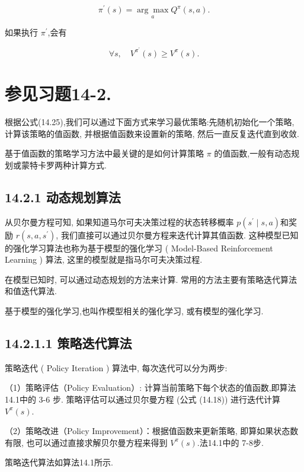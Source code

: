 \documentclass[10pt]{article}
\begin{document}
\begin{equation*}
\pi^{\prime}(s)=\underset{a}{\arg \max } Q^{\pi}(s, a) . \tag{14.24}
\end{equation*}


如果执行 $\pi^{\prime}$,会有


\begin{equation*}
\forall s, \quad V^{\pi^{\prime}}(s) \geq V^{\pi}(s) . \tag{14.25}
\end{equation*}


\section*{参见习题14-2.}
根据公式(14.25),我们可以通过下面方式来学习最优策略:先随机初始化一个策略, 计算该策略的值函数, 并根据值函数来设置新的策略, 然后一直反复迭代直到收敛.

基于值函数的策略学习方法中最关键的是如何计算策略 $\pi$ 的值函数,一般有动态规划或蒙特卡罗两种计算方式.

\subsection*{14.2.1 动态规划算法}
从贝尔曼方程可知, 如果知道马尔可夫决策过程的状态转移概率 $p\left(s^{\prime} \mid s, a\right)$和奖励 $r\left(s, a, s^{\prime}\right)$, 我们直接可以通过贝尔曼方程来迭代计算其值函数. 这种模型已知的强化学习算法也称为基于模型的强化学习 ( Model-Based Reinforcement Learning ) 算法, 这里的模型就是指马尔可夫决策过程.

在模型已知时, 可以通过动态规划的方法来计算. 常用的方法主要有策略迭代算法和值迭代算法.

基于模型的强化学习,也叫作模型相关的强化学习, 或有模型的强化学习.

\subsection*{14.2.1.1 策略迭代算法}
策略迭代 ( Policy Iteration ) 算法中, 每次迭代可以分为两步:

（1）策略评估（Policy Evaluation）: 计算当前策略下每个状态的值函数,即算法14.1中的 3-6 步. 策略评估可以通过贝尔曼方程 (公式 (14.18)) 进行迭代计算 $V^{\pi}(s)$.

（2）策略改进（Policy Improvement）：根据值函数来更新策略, 即算如果状态数有限, 也可以通过直接求解贝尔曼方程来得到 $V^{\pi}(s)$.法14.1中的 7-8步.

策略迭代算法如算法14.1所示.
\end{document}
